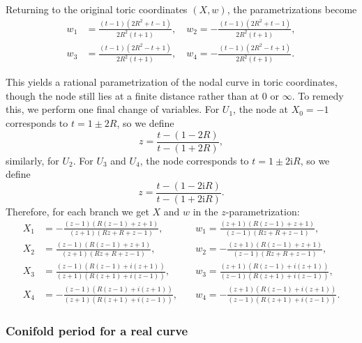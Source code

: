 \documentclass[11pt, a4paper]{article}
\newcommand{\ii}{\mathrm{i}}
\numberwithin{equation}{section}
\begin{document}
Returning to the original toric coordinates $(X, w)$, the parametrizations become
\begin{equation}
  \begin{aligned}
  w_1 &= \frac{(t-1) \left(2 R^2+t-1\right)}{2 R^2 (t+1)}, \quad
  w_2 = -\frac{(t-1) \left(2 R^2+t-1\right)}{2 R^2 (t+1)}, \\
  w_3 &= \frac{(t-1) \left(2 R^2-t+1\right)}{2 R^2 (t+1)}, \quad
  w_4 = -\frac{(t-1) \left(2 R^2-t+1\right)}{2 R^2 (t+1)}.
  \end{aligned}
\end{equation}

This yields a rational parametrization of the nodal curve in toric coordinates, though the node still lies at a finite distance rather than at $0$ or $\infty$. To remedy this, we perform one final change of variables. For $U_1$, the node at $X_0 = -1$ corresponds to $t = 1 \pm 2R$, so we define
\begin{equation}
  z = \frac{t - (1-2R)}{t - (1+2R)},
\end{equation}
similarly, for $U_2$. For $U_3$ and $U_4$, the node corresponds to $t = 1 \pm 2 \ii R$, so we define
\begin{equation}
  z = \frac{t - (1-2\ii R)}{t - (1+2\ii R)}.
\end{equation}
Therefore, for each branch we get $X$ and $w$ in the $z$-parametrization:
\begin{equation}\label{eq:F0rationalparam}
  \begin{aligned}
    X_1 &= -\frac{(z-1) (R (z-1)+z+1)}{(z+1) (R z+R+z-1)}, &\quad
    w_1 = \frac{(z+1) (R (z-1)+z+1)}{(z-1) (R z+R+z-1)}, \\
    X_2 &= \frac{(z-1) (R (z-1)+z+1)}{(z+1) (R z+R+z-1)}, &\quad
    w_2 = -\frac{(z+1) (R (z-1)+z+1)}{(z-1) (R z+R+z-1)}, \\
    X_3 &= \frac{(z-1) (R (z-1)+i (z+1))}{(z+1) (R (z+1)+i (z-1))}, &\quad
    w_3 = \frac{(z+1) (R (z-1)+i (z+1))}{(z-1) (R (z+1)+i (z-1))}, \\
    X_4 &= -\frac{(z-1) (R (z-1)+i (z+1))}{(z+1) (R (z+1)+i (z-1))}, &\quad
    w_4 = -\frac{(z+1) (R (z-1)+i (z+1))}{(z-1) (R (z+1)+i (z-1))}.
  \end{aligned}
\end{equation}

\subsubsection{Conifold period for a real curve}
\end{document}
